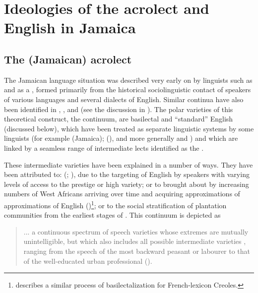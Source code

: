 \chapter{Ideologies of the acrolect and English in Jamaica}\label{ch:1}
\section{The (Jamaican) acrolect}\label{sec:1.1}

The Jamaican language situation was described very early on by linguists such as \citet{LePage1960} and \citet{DeCamp1961,DeCamp1971} as a , formed primarily from the historical sociolinguistic contact of speakers of various  languages and several dialects of English.  Similar continua have also been identified in , ,  and  (see the discussion in \citealt[233--236]{Winford1997}).  The polar varieties of this theoretical construct, the continuum, are basilectal  and “standard” English (discussed below), which have been treated as separate linguistic systems by some linguists (for example \citealt{Bailey1971} (Jamaica); \citealt{Devonish1978} (), and more generally \citealt{Alleyne1980a} and \citealt{Winford1997}) and which are linked by a seamless range of intermediate lects identified as the .  

These intermediate varieties have been explained in a number of ways.  They have been attributed to:  (\citealt{Bickerton1973}; \citealt{DeCamp1971}), due to the targeting of English by  speakers with varying levels of access to the prestige or high variety; or to  brought about by increasing numbers of West Africans arriving over time and acquiring approximations of approximations of English (\citealt{Mufwene1996,Mufwene2001})\footnote{\citet{Chaudenson2001} describes a similar process of basilectalization for French-lexicon Creoles.}; or to the social stratification of plantation communities from the earliest stages of  \citep{Alleyne1980a}.  This continuum is depicted as 

\begin{quote}
... a continuous spectrum of speech varieties whose extremes are mutually unintelligible, but which also includes all possible intermediate varieties \citep[28]{DeCamp1971}, ranging from the speech of the most backward peasant or labourer to that of the well-educated urban professional (\citealt[82]{DeCamp1961}).
\end{quote}

